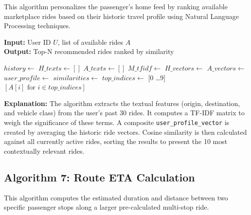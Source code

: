 This algorithm personalizes the passenger's home feed by ranking available marketplace rides based on their historic travel profile using Natural Language Processing techniques.

\begin{algorithm}[H]
\caption{Term Frequency-Inverse Document Frequency (TF-IDF) Ride Matching}
\textbf{Input:} User ID $U$, list of available rides $A$ \\
\textbf{Output:} Top-N recommended rides ranked by similarity
\begin{algorithmic}[1]
    \State $history \gets$ 
        \State \Return {} 
    \EndIf
    \State $H\_texts \gets [ ]$
        \State {}
    \EndFor
    \State $A\_texts \gets [ ]$
        \State {}
    \EndFor
    \State $M\_tfidf \gets$ 
    \State $H\_vectors \gets$ 
    \State $A\_vectors \gets$ 
    \State $user\_profile \gets$ 
    \State $similarities \gets$ 
    \State $top\_indices \gets$ [0 \dots 9]
    \State \Return $[A[i] \text{ for } i \in top\_indices]$
\EndFunction
\end{algorithmic}
\end{algorithm}

\textbf{Explanation:} The algorithm extracts the textual features (origin, destination, and vehicle class) from the user's past 30 rides. It computes a TF-IDF matrix to weigh the significance of these terms. A composite \texttt{user\_profile\_vector} is created by averaging the historic ride vectors. Cosine similarity is then calculated against all currently active rides, sorting the results to present the 10 most contextually relevant rides.

\subsection{Algorithm 7: Route ETA Calculation}

This algorithm computes the estimated duration and distance between two specific passenger stops along a larger pre-calculated multi-stop ride.

